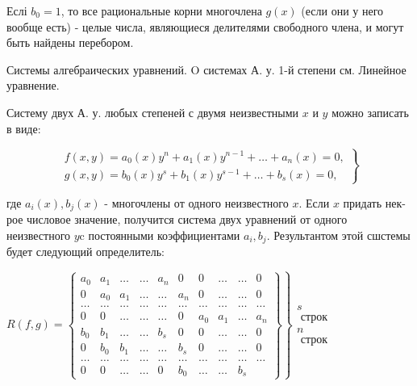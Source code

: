 \documentclass[10pt]{article}
\begin{document}
Еслі $b_{0}=1$, то все рациональные корни многочлена $g(x)$ (если они у него вообще есть) - целые числа, являющиеся делителями свободного члена, и могут быть найдены перебором.



Системы алгебраических уравнений. $\mathrm{O}$ системах А. у. 1-й степени см. Линейное уравнение.



Систему двух А. у. любых степеней с двумя неизвестными $x$ и $y$ можно записать в виде:



\[

\left.\begin{array}{l}

f(x, y)=a_{0}(x) y^{n}+a_{1}(x) y^{n-1}+\ldots+a_{n}(x)=0, \\

g(x, y)=b_{0}(x) y^{s}+b_{1}(x) y^{s-1}+\ldots+b_{s}(x)=0,

\end{array}\right\}

\]



где $a_{i}(x), b_{j}(x)$ - многочлены от одного неизвестного $x$. Если $x$ придать нек-рое числовое значение, получится система двух уравнений от одного неизвестного $y \mathrm{c}$ постоянными коэффициентами $a_{i}, b_{j}$. Результантом этой сшстемы будет следующий определитель:



$\left.R(f, g)=\left\{\begin{array}{cccccccccc}a_{0} & a_{1} & \ldots & \ldots & a_{n} & 0 & 0 & \ldots & \ldots & 0 \\ 0 & a_{0} & a_{1} & \ldots & \ldots & a_{n} & 0 & \ldots & \ldots & 0 \\ \ldots & \ldots & \ldots & \ldots & \ldots & \ldots & \ldots & \ldots & \ldots & \ldots \\ 0 & 0 & \ldots & \ldots & \ldots & 0 & a_{0} & a_{1} & \ldots & a_{n} \\ b_{0} & b_{1} & \ldots & \ldots & b_{s} & 0 & 0 & \ldots & \ldots & 0 \\ 0 & b_{0} & b_{1} & \ldots & \ldots & b_{s} & 0 & \ldots & \ldots & 0 \\ \ldots & \ldots & \ldots & \ldots & \ldots & \ldots & \ldots & \ldots & \ldots & \ldots \\ 0 & 0 & \ldots & \ldots & 0 & b_{0} & \ldots & \ldots & b_{s}\end{array}\right\}\right\} \begin{gathered}s \\ \text { строк } \\ n \\ \text { строк }\end{gathered}$
\end{document}
